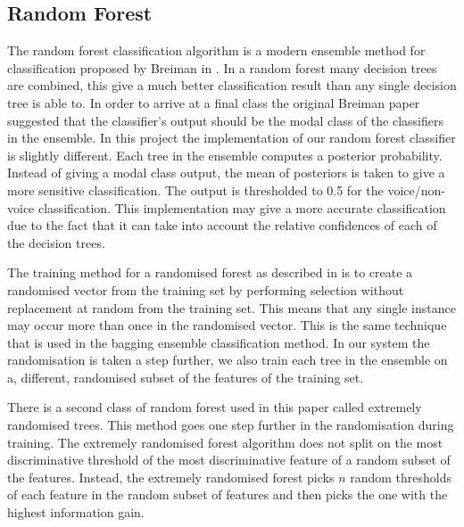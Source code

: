 \documentclass[ %
                    author={Sam Phippen},
                supervisor={Dr. Rafal Bogacz},
                     title={Real time voice activity detectors in noisy personal computing environments},
                  subtitle={},
                    degree={MEng},
                      year={2012} ]{thesis}
\begin{document}

\subsection{Random Forest}
\label{section:random-forest}

The random forest classification algorithm is a modern ensemble method for
classification proposed by Breiman in \cite{breiman}. In a random forest many
decision trees are combined, this give a much better classification result than
any single decision tree is able to. In order to arrive at a final class the
original Breiman paper suggested that the classifier's output should be the
modal class of the classifiers in the ensemble.  In this project the
implementation of our random forest classifier is slightly different. Each tree
in the ensemble computes a posterior probability. Instead of giving a modal
class output, the mean of posteriors is taken to give a more sensitive
classification. The output is thresholded to 0.5 for the voice/non-voice
classification. This implementation may give a more accurate classification due
to the fact that it can take into account the relative confidences of each of
the decision trees.

The training method for a randomised forest as described in \cite{breiman} is
to create a randomised vector from the training set by performing selection
without replacement at random from the training set. This means that any single
instance may occur more than once in the randomised vector. This is the same
technique that is used in the bagging ensemble classification method. In our
system the randomisation is taken a step further, we also train each tree in
the ensemble on a, different, randomised subset of the features of the training
set.

There is a second class of random forest used in this paper called extremely
randomised trees. This method goes one step further in the randomisation during
training. The extremely randomised forest algorithm does not split on the most
discriminative threshold of the most discriminative feature of a random subset
of the features. Instead, the extremely randomised forest picks $n$ random
thresholds of each feature in the random subset of features and then picks the
one with the highest information gain.
\end{document}
